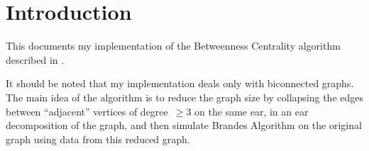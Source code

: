 \section{Introduction}
This documents my implementation of the Betweenness Centrality algorithm
described in \cite{pachorkar16}.

It should be noted that my implementation deals only with biconnected graphs.
The main idea of the algorithm is to reduce the graph size by collapsing
the edges between ``adjacent'' vertices of degree~$\geq 3$ on the same
ear, in an ear decomposition of the graph, and then simulate Brandes
Algorithm on the original graph using data from this reduced graph.
